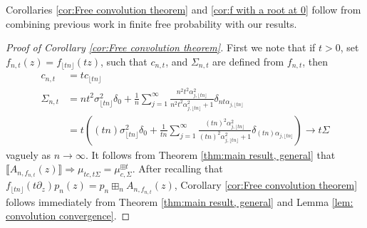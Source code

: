 \documentclass[reqno]{amsart}
\newcommand{\1}{\mathbf{1}}
\theoremstyle{plain}
\theoremstyle{definition}
\theoremstyle{remark}
\numberwithin{equation}{section}
\begin{document}
		Corollaries \ref{cor:Free convolution theorem} and \ref{cor:f with a root at 0} follow from combining previous work in finite free probability with our results. 
	\begin{proof}[Proof of Corollary \ref{cor:Free convolution theorem}]
		First we note that if $t>0$, set $f_{n,t}(z)= f_{\lfloor tn\rfloor }(tz)$, such that $c_{n,t}$, and $\Sigma_{n,t}$ are defined from $f_{n,t}$, then 
		 \begin{equation}\label{eq:time change limit computation}
			\begin{aligned}
				c_{n,t}&=tc_{ \lfloor tn\rfloor }\\ \Sigma_{n,t}&=nt^2\sigma_{\lfloor tn\rfloor}^2\delta_{0}+\frac{1}{n}\sum_{j=1}^{\infty}\frac{n^2t^2\alpha_{j,\lfloor tn\rfloor}^2}{n^2t^2\alpha_{j,\lfloor tn\rfloor}^2+1}\delta_{nt\alpha_{j,\lfloor tn\rfloor }}\\
				&=t\left((tn)\sigma_{\lfloor tn\rfloor}^2\delta_{0}+\frac{1}{tn}\sum_{j=1}^{\infty}\frac{(tn)^2\alpha_{j,\lfloor tn\rfloor}^2}{(tn)^2\alpha_{j,\lfloor tn\rfloor}^2+1}\delta_{(tn)\alpha_{j,\lfloor tn\rfloor }} \right)\to t\Sigma
			\end{aligned}
		\end{equation} 
		vaguely as $n\to\infty$.
		It follows from Theorem \ref{thm:main result, general} that $\llbracket A_{n,f_{n,t}}(z)\rrbracket
		\Rightarrow\mu_{tc,t\Sigma} = \mu_{c,\Sigma }^{\boxplus t}$. 		
		After recalling that $f_{\lfloor tn\rfloor}(t\partial_z)p_n(z)=p_n\boxplus_{n} A_{n, f_{n,t}}(z)$, Corollary \ref{cor:Free convolution theorem} follows immediately from Theorem \ref{thm:main result, general} and Lemma \ref{lem: convolution convergence}.
	\end{proof}
	
\end{document}
